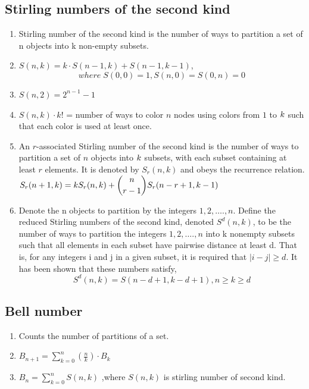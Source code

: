 \subsection{Stirling numbers of the second kind} 
\begin{enumerate}
\item Stirling number of the second kind is the number of ways to partition a set of n objects into k non-empty subsets.
\item $S(n,k)=k \cdot S(n-1,k)+S(n-1,k-1)$,
    $$ where \; S(0,0)=1,S(n,0)=S(0,n)=0 $$
\item $S(n,2)=2^{n-1}-1$
\item $S(n,k) \cdot k!$ = number of ways to color $n$ nodes using colors from $\displaystyle 1$ to $\displaystyle \displaystyle k$ such that each color is used at least once.
\item An $r$-associated Stirling number of the second kind is the number of ways to partition a set of $n$ objects into $\displaystyle \displaystyle k$ subsets, with each subset containing at least $r$ elements. It is denoted by $S_r( n , k )$ and obeys the recurrence relation.
     $\displaystyle \displaystyle S_r(n+1,k) = k S_r(n,k) + \binom{n}{r-1} S_r(n-r+1,k-1)$
\item Denote the n objects to partition by the integers $\displaystyle 1, 2,  \ldots ., n$. Define the reduced Stirling numbers of the second kind, denoted $S^d(n, k)$, to be the number of ways to partition the integers $\displaystyle 1, 2,  \ldots ., n$ into k nonempty subsets such that all elements in each subset have pairwise distance at least d. 
     That is, for any integers i and j in a given subset, it is required that $|i - j| \geq d$. It has been shown that these numbers satisfy,
     $$S^d(n, k) = S(n - d + 1, k - d + 1), n \geq k \geq d$$
\end{enumerate}

\subsection{Bell number}
\begin{enumerate}
\item Counts the number of partitions of a set.
\item $B_{n+1}=\displaystyle\sum_{k=0}^{n}\left(\frac{n}{k}\right) \cdot B_{k}$
\item $B_{n}=\displaystyle\sum_{k=0}^{n}S(n,k)$ ,where $S(n,k)$ is stirling number of second kind.
\end{enumerate}



